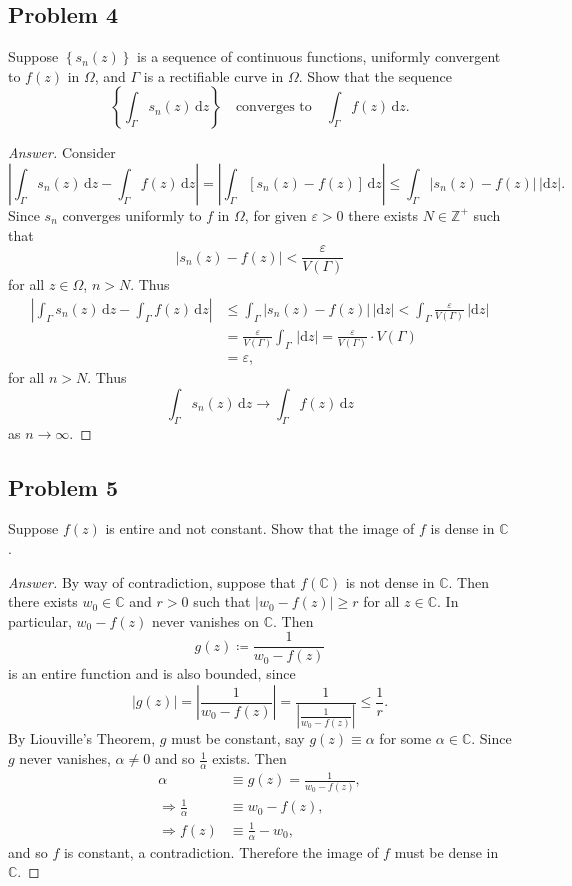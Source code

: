 \documentclass[12pt]{article}
\newcommand{\z}{\mathbb{Z}}
\newcommand{\cx}{\mathbb{C}}
\newcommand\setb[1]{\left \{ #1 \right \}}
\newcommand{\sqbrack}[1]{\left [ #1 \right ]}
\newcommand{\abs}[1]{\left| #1 \right|}
\newcommand{\eps}{\varepsilon}
\renewcommand{\i}[4]{\int_{#1}^{#2} {#3} \, \mathrm{d} {#4} }
\newcommand{\rd}{\mathrm{d}}
\theoremstyle{definition}
\begin{document}
\subsection{Problem 4}
Suppose $\setb{ s_n(z) }$ is a sequence of continuous functions, uniformly convergent to $f(z)$ in $\Omega$, and $\Gamma$ is a rectifiable curve in $\Omega$. Show that the sequence 
\[
    \setb{ \i{\Gamma}{}{s_n(z)}{z} } \quad \text{converges to} \quad \i{\Gamma}{}{f(z)}{z} . 
\]
\begin{proof}[Answer]
    Consider 
    \[
        \abs{ \i{\Gamma}{}{s_n(z)}{z} - \i{\Gamma}{}{f(z)}{z} } = \abs{ \i{\Gamma}{}{ \sqbrack{ s_n(z) - f(z) } }{z} } \leq \int_{\Gamma} \abs{ s_n(z) - f(z) } \, \abs{ \rd z } . 
    \]
    Since $s_n$ converges uniformly to $f$ in $\Omega$, for given $\eps > 0$ there exists $N \in \z^+$ such that 
    \[
        \abs{ s_n(z) - f(z) } < \frac{\eps}{V(\Gamma)} 
    \]
    for all $z \in \Omega$, $n > N$. Thus 
    \begin{align*}
        \abs{ \i{\Gamma}{}{s_n(z)}{z} - \i{\Gamma}{}{f(z)}{z} } & \leq \int_{\Gamma} \abs{ s_n(z) - f(z) } \, \abs{ \rd z } < \int_{\Gamma} \frac{\eps}{V(\Gamma)} \, \abs{ \rd z } \\ 
        & = \frac{\eps}{V(\Gamma)} \int_{\Gamma} \, \abs{ \rd z } = \frac{\eps}{V(\Gamma)} \cdot V(\Gamma) \\ 
        & = \eps ,
    \end{align*}
    for all $n > N$. Thus 
    \[
        \i{\Gamma}{}{s_n(z)}{z} \to \i{\Gamma}{}{f(z)}{z}
    \]
    as $n \to \infty$. 
\end{proof}

\subsection{Problem 5}
Suppose $f(z)$ is entire and not constant. Show that the image of $f$ is dense in $\cx$.
\begin{proof}[Answer]
    By way of contradiction, suppose that $f(\cx)$ is not dense in $\cx$. Then there exists $w_0 \in \cx$ and $r > 0$ such that $\abs{ w_0 - f(z) } \geq r$ for all $z \in \cx$. In particular, $w_0 - f(z)$ never vanishes on $\cx$. Then 
    \[
        g(z) \coloneqq \frac{1}{w_0 - f(z)}
    \]
    is an entire function and is also bounded, since 
    \[
        \abs{ g(z) } = \abs{ \frac{1}{w_0 - f(z)} } = \frac{1}{\abs{ \frac{1}{w_0 - f(z)} }} \leq \frac{1}{r} . 
    \]
    By Liouville's Theorem, $g$ must be constant, say $g(z) \equiv \alpha$ for some $\alpha \in \cx$. Since $g$ never vanishes, $\alpha \neq 0$ and so $\frac{1}{\alpha}$ exists. Then 
    \begin{align*}
        \alpha & \equiv g(z) = \frac{1}{w_0 - f(z)} , \\ 
        \Rightarrow \frac{1}{\alpha} & \equiv w_0 - f(z) , \\ 
        \Rightarrow f(z) & \equiv \frac{1}{\alpha} - w_0 , 
    \end{align*}
    and so $f$ is constant, a contradiction. Therefore the image of $f$ must be dense in $\cx$. 
\end{proof}
\end{document}
